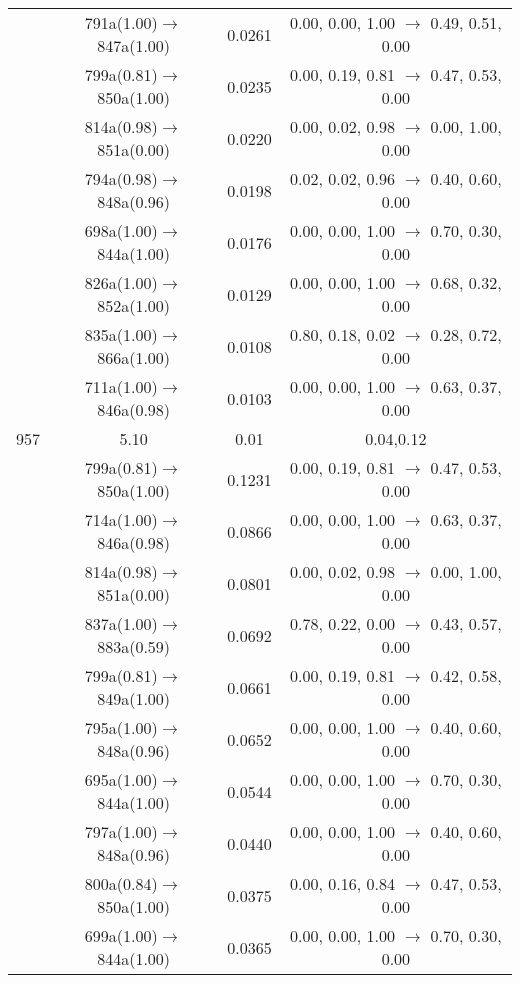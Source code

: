 \documentclass[10pt,a4paper]{article}
\begin{document}
\begin{longtable}{c|c|c|c}
 	& 791a(1.00)$\rightarrow$847a(1.00) &	 0.0261 &	 0.00, 0.00, 1.00 $\rightarrow$ 0.49, 0.51, 0.00 \\ 
 	& 799a(0.81)$\rightarrow$850a(1.00) &	 0.0235 &	 0.00, 0.19, 0.81 $\rightarrow$ 0.47, 0.53, 0.00 \\ 
 	& 814a(0.98)$\rightarrow$851a(0.00) &	 0.0220 &	 0.00, 0.02, 0.98 $\rightarrow$ 0.00, 1.00, 0.00 \\ 
 	& 794a(0.98)$\rightarrow$848a(0.96) &	 0.0198 &	 0.02, 0.02, 0.96 $\rightarrow$ 0.40, 0.60, 0.00 \\ 
 	& 698a(1.00)$\rightarrow$844a(1.00) &	 0.0176 &	 0.00, 0.00, 1.00 $\rightarrow$ 0.70, 0.30, 0.00 \\ 
 	& 826a(1.00)$\rightarrow$852a(1.00) &	 0.0129 &	 0.00, 0.00, 1.00 $\rightarrow$ 0.68, 0.32, 0.00 \\ 
 	& 835a(1.00)$\rightarrow$866a(1.00) &	 0.0108 &	 0.80, 0.18, 0.02 $\rightarrow$ 0.28, 0.72, 0.00 \\ 
 	& 711a(1.00)$\rightarrow$846a(0.98) &	 0.0103 &	 0.00, 0.00, 1.00 $\rightarrow$ 0.63, 0.37, 0.00 \\ 
 \hline957 &	 5.10 &	 0.01 &	 0.04,0.12 \\ 
  	& 799a(0.81)$\rightarrow$850a(1.00) &	 0.1231 &	 0.00, 0.19, 0.81 $\rightarrow$ 0.47, 0.53, 0.00 \\ 
 	& 714a(1.00)$\rightarrow$846a(0.98) &	 0.0866 &	 0.00, 0.00, 1.00 $\rightarrow$ 0.63, 0.37, 0.00 \\ 
 	& 814a(0.98)$\rightarrow$851a(0.00) &	 0.0801 &	 0.00, 0.02, 0.98 $\rightarrow$ 0.00, 1.00, 0.00 \\ 
 	& 837a(1.00)$\rightarrow$883a(0.59) &	 0.0692 &	 0.78, 0.22, 0.00 $\rightarrow$ 0.43, 0.57, 0.00 \\ 
 	& 799a(0.81)$\rightarrow$849a(1.00) &	 0.0661 &	 0.00, 0.19, 0.81 $\rightarrow$ 0.42, 0.58, 0.00 \\ 
 	& 795a(1.00)$\rightarrow$848a(0.96) &	 0.0652 &	 0.00, 0.00, 1.00 $\rightarrow$ 0.40, 0.60, 0.00 \\ 
 	& 695a(1.00)$\rightarrow$844a(1.00) &	 0.0544 &	 0.00, 0.00, 1.00 $\rightarrow$ 0.70, 0.30, 0.00 \\ 
 	& 797a(1.00)$\rightarrow$848a(0.96) &	 0.0440 &	 0.00, 0.00, 1.00 $\rightarrow$ 0.40, 0.60, 0.00 \\ 
 	& 800a(0.84)$\rightarrow$850a(1.00) &	 0.0375 &	 0.00, 0.16, 0.84 $\rightarrow$ 0.47, 0.53, 0.00 \\ 
 	& 699a(1.00)$\rightarrow$844a(1.00) &	 0.0365 &	 0.00, 0.00, 1.00 $\rightarrow$ 0.70, 0.30, 0.00 \\ 

\end{longtable}
\end{document}
